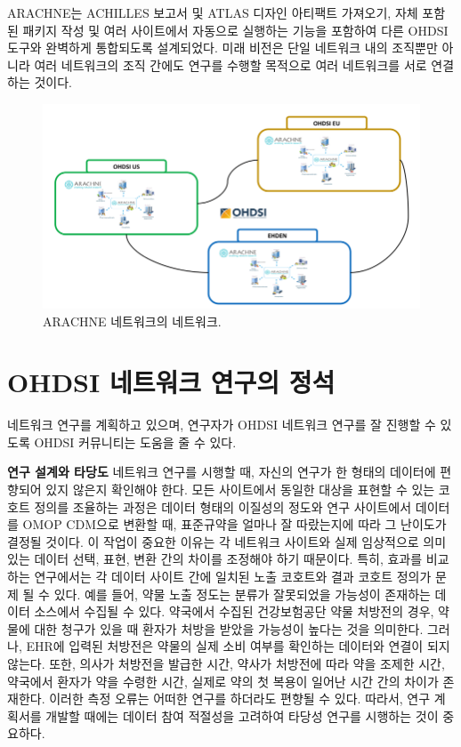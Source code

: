 \documentclass[11pt]{book}
\theoremstyle{definition}
\theoremstyle{definition}
\theoremstyle{definition}
\theoremstyle{remark}
\begin{document}
ARACHNE는 ACHILLES 보고서 및 ATLAS 디자인 아티팩트 가져오기, 자체 포함된
패키지 작성 및 여러 사이트에서 자동으로 실행하는 기능을 포함하여 다른
OHDSI 도구와 완벽하게 통합되도록 설계되었다. 미래 비전은 단일 네트워크
내의 조직뿐만 아니라 여러 네트워크의 조직 간에도 연구를 수행할 목적으로
여러 네트워크를 서로 연결하는 것이다.

\begin{figure}[h]

{\centering \includegraphics[width=0.9\linewidth]{images/NetworkStudies/ARACHNENON} 

}

\caption{ARACHNE 네트워크의 네트워크.}\label{fig:arachneNon}
\end{figure}

\section{OHDSI 네트워크 연구의 정석}\label{ohdsi---}


네트워크 연구를 계획하고 있으며, 연구자가 OHDSI 네트워크 연구를 잘
진행할 수 있도록 OHDSI 커뮤니티는 도움을 줄 수 있다.

\textbf{연구 설계와 타당도} 네트워크 연구를 시행할 때, 자신의 연구가 한
형태의 데이터에 편향되어 있지 않은지 확인해야 한다. 모든 사이트에서
동일한 대상을 표현할 수 있는 코호트 정의를 조율하는 과정은 데이터 형태의
이질성의 정도와 연구 사이트에서 데이터를 OMOP CDM으로 변환할 때,
표준규약을 얼마나 잘 따랐는지에 따라 그 난이도가 결정될 것이다. 이
작업이 중요한 이유는 각 네트워크 사이트와 실제 임상적으로 의미 있는
데이터 선택, 표현, 변환 간의 차이를 조정해야 하기 때문이다. 특히, 효과를
비교하는 연구에서는 각 데이터 사이트 간에 일치된 노출 코호트와 결과
코호트 정의가 문제 될 수 있다. 예를 들어, 약물 노출 정도는 분류가
잘못되었을 가능성이 존재하는 데이터 소스에서 수집될 수 있다. 약국에서
수집된 건강보험공단 약물 처방전의 경우, 약물에 대한 청구가 있을 때
환자가 처방을 받았을 가능성이 높다는 것을 의미한다. 그러나, EHR에 입력된
처방전은 약물의 실제 소비 여부를 확인하는 데이터와 연결이 되지 않는다.
또한, 의사가 처방전을 발급한 시간, 약사가 처방전에 따라 약을 조제한
시간, 약국에서 환자가 약을 수령한 시간, 실제로 약의 첫 복용이 일어난
시간 간의 차이가 존재한다. 이러한 측정 오류는 어떠한 연구를 하더라도
편향될 수 있다. 따라서, 연구 계획서를 개발할 때에는 데이터 참여 적절성을
고려하여 타당성 연구를 시행하는 것이 중요하다.
\end{document}
